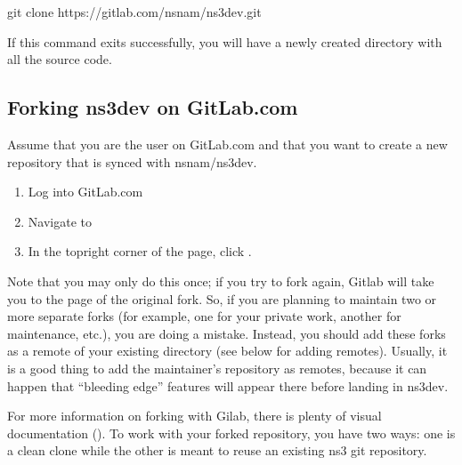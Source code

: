 \documentclass[letterpaper,10pt,english]{sphinxmanual}
\renewcommand{\sphinxcode}[1]{\texttt{\small{#1}}}
\begin{document}
\begin{sphinxVerbatim}[commandchars=\\\{\}]
\PYGZdl{} git clone https://gitlab.com/nsnam/ns\PYGZhy{}3\PYGZhy{}dev.git
\end{sphinxVerbatim}

If this command exits successfully, you will have a newly created  directory with all the source code.


\subsection{Forking ns\sphinxhyphen{}3\sphinxhyphen{}dev on GitLab.com}
\label{\detokenize{working-with-git:forking-ns-3-dev-on-gitlab-com}}
Assume that you are the user  on GitLab.com and that you want to create a new repository that is synced with nsnam/ns\sphinxhyphen{}3\sphinxhyphen{}dev.
\begin{enumerate}
%
\item {} 
Log into GitLab.com

\item {} 
Navigate to 

\item {} 
In the top\sphinxhyphen{}right corner of the page, click \sphinxcode{}.

\end{enumerate}

Note that you may only do this once; if you try to fork again, Gitlab will take you to the page of the original fork. So, if you are planning to maintain two or more separate forks (for example, one for your private work, another for maintenance, etc.), you are doing a mistake. Instead, you should add these forks as a remote of your existing directory (see below for adding remotes). Usually, it is a good thing to add the maintainer’s repository as remotes, because it can happen that “bleeding edge” features will appear there before landing in ns\sphinxhyphen{}3\sphinxhyphen{}dev.

For more information on forking with Gilab, there is plenty of visual documentation (). To work with your forked repository, you have two ways: one is a clean clone while the other is meant to re\sphinxhyphen{}use an existing ns\sphinxhyphen{}3 git repository.
\end{document}
